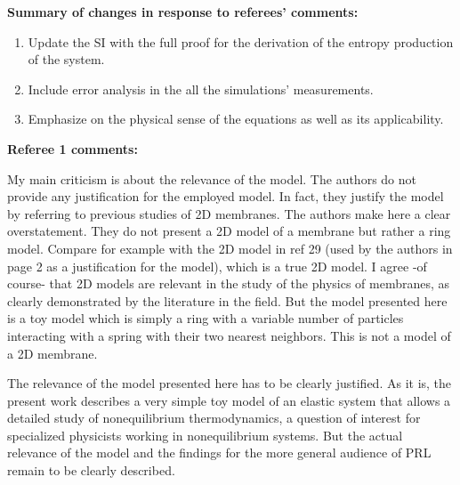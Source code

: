 \documentclass{letter}
\begin{document}
\begin{letter}{}
\vspace*{-11\baselineskip}
\opening{}




{\bf Summary of changes in response to referees' comments:}
\begin{enumerate}
\item Update the SI with the full proof for the derivation of the entropy production of the system. 
\item Include error analysis in the all the simulations' measurements. 
\item  Emphasize on the physical sense of the equations as well as its applicability.

\end{enumerate}

{\bf Referee 1 comments:}
\newline
{
My main criticism is about the relevance of the model. The authors do 
not provide any justification for the employed model. In fact, they 
justify the model by referring to previous studies of 2D membranes. 
The authors make here a clear overstatement. They do not present a 2D 
model of a membrane but rather a ring model. Compare for example with 
the 2D model in ref 29 (used by the authors in page 2 as a 
justification for the model), which is a true 2D model. I agree -of 
course- that 2D models are relevant in the study of the physics of 
membranes, as clearly demonstrated by the literature in the field. But 
the model presented here is a toy model which is simply a ring with a 
variable number of particles interacting with a spring with their two 
nearest neighbors. This is not a model of a 2D membrane.

 The relevance of the model presented here has to be clearly justified. 
As it is, the present work describes a very simple toy model of an 
elastic system that allows a detailed study of nonequilibrium 
thermodynamics, a question of interest for specialized physicists 
working in nonequilibrium systems. But the actual relevance of the 
model and the findings for the more general audience of PRL remain to 
be clearly described.
}


\end{letter}
\end{document}
